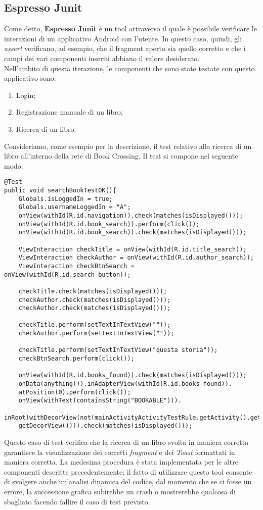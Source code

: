 \subsection{Espresso Junit}
Come detto, \textbf{Espresso Junit} è un tool attraverso il quale è possibile verificare le interazioni di un applicativo Android con l'utente. In questo caso, quindi, gli \textit{assert} verificano, ad esempio, che il fragment aperto sia quello corretto e che i campi dei vari componenti inseriti abbiano il valore desiderato.
\\ \noindent
Nell'ambito di questa iterazione, le componenti che sono state testate con questo applicativo sono:
\begin{enumerate}
	\item Login;
	\item Registrazione manuale di un libro;
	\item Ricerca di un libro.
\end{enumerate}
\noindent 
Consideriamo, come esempio per la descrizione, il test relativo alla ricerca di un libro all'interno della rete di Book Crossing. Il test si compone nel seguente modo:
\begin{lstlisting}
@Test
public void searchBookTestOK(){
	Globals.isLoggedIn = true;
	Globals.usernameLoggedIn = "A";
	onView(withId(R.id.navigation)).check(matches(isDisplayed()));
	onView(withId(R.id.book_search)).perform(click());
	onView(withId(R.id.book_search)).check(matches(isDisplayed()));
	
	ViewInteraction checkTitle = onView(withId(R.id.title_search));
	ViewInteraction checkAuthor = onView(withId(R.id.author_search));
	ViewInteraction checkBtnSearch = onView(withId(R.id.search_button));
	
	checkTitle.check(matches(isDisplayed()));
	checkAuthor.check(matches(isDisplayed()));
	checkAuthor.check(matches(isDisplayed()));
	
	checkTitle.perform(setTextInTextView(""));
	checkAuthor.perform(setTextInTextView(""));
	
	checkTitle.perform(setTextInTextView("questa storia"));
	checkBtnSearch.perform(click());
	
	onView(withId(R.id.books_found)).check(matches(isDisplayed()));
	onData(anything()).inAdapterView(withId(R.id.books_found)).
	atPosition(0).perform(click());
	onView(withText(containsString("BOOKABLE"))).
	inRoot(withDecorView(not(mainActivityActivityTestRule.getActivity().getWindow().
	getDecorView()))).check(matches(isDisplayed()));
\end{lstlisting}
\noindent Questo caso di test verifica che la ricerca di un libro svolta in maniera corretta garantisce la visualizzazione dei corretti \textit{fragment} e dei \textit{Toast} formattati in maniera corretta.
La medesima procedura è stata implementata per le altre componenti descritte precedentemente; il fatto di utilizzare questo tool consente di svolgere anche un'analisi dinamica del codice, dal momento che se ci fosse un errore, la successione grafica subirebbe un crash o mostrerebbe qualcosa di sbagliato facendo fallire il caso di test previsto.
